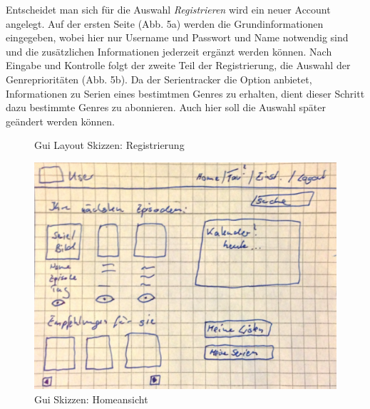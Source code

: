 \documentclass[a4paper]{article}
\begin{document}
\newpage

Entscheidet man sich für die Auswahl \textit{Registrieren} wird ein neuer Account angelegt. Auf der ersten Seite (Abb. 5a) werden die Grundinformationen eingegeben, wobei hier nur Username und Passwort und Name notwendig sind und die zusätzlichen Informationen jederzeit ergänzt werden können. Nach Eingabe und Kontrolle folgt der zweite Teil der Registrierung, die Auswahl der Genreprioritäten (Abb. 5b). Da der Serientracker die Option anbietet, Informationen zu Serien eines bestimtmen Genres zu erhalten, dient dieser Schritt dazu bestimmte Genres zu abonnieren. Auch hier soll die Auswahl später geändert werden können.\\

\begin{figure}[h!]
\centering
\hfill %
\hfill %
\hfill %
\caption{Gui Layout Skizzen: Registrierung }
\label{Gui}
\end{figure}

\parskip 12pt
\parindent 0pt


\begin{figure}
\centering
\includegraphics[width=.5\textwidth]{images/dokulayout/home.png}
\caption{Gui Skizzen: Homeansicht}
\end{figure}
\end{document}
